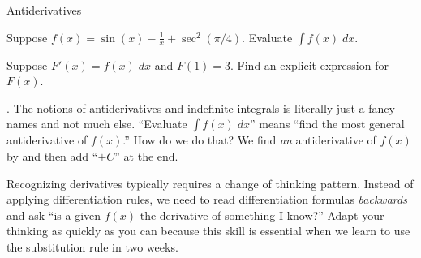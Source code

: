 \documentclass[../main.tex]{subfiles}
\begin{document}
\begin{lesson}{Antiderivatives}
\begin{mdframed}[style=withref-compact]
  \end{mdframed}

  \begin{example}
    Suppose \(f(x) = \sin(x) - \frac{1}{x} + \sec^{2}(\pi/4)\). Evaluate \(\int f(x) \;dx\). 

    Suppose \(F'(x) = f(x)\;dx\) and \(F(1) = 3\). Find an explicit expression for \(F(x)\).

  \end{example}

  . The notions of antiderivatives and indefinite integrals is literally just a fancy names and not much else. ``Evaluate \(\textstyle \int f(x) \;dx\)'' means ``find the most general antiderivative of \(f(x)\).'' How do we do that? We find \emph{an} antiderivative of \(f(x)\) by  and then add ``\(+ C\)'' at the end.

  Recognizing derivatives typically requires a change of thinking pattern. Instead of applying differentiation rules, we need to read differentiation formulas \emph{backwards} and ask ``is a given \(f(x)\) the derivative of something I know?'' Adapt your thinking as quickly as you can because this skill is essential when we learn to use the substitution rule in two weeks.

  \clearpage
\end{lesson}
\end{document}
